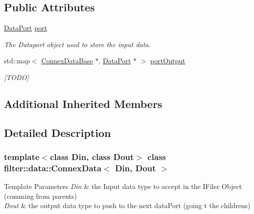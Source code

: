\subsection*{Public Attributes}
\begin{DoxyCompactItemize}
\item 
\hyperlink{classfilter_1_1data_1_1_data_port}{Data\+Port} \hyperlink{classfilter_1_1data_1_1_connex_data_a607857efe30c0053b56daf6a4da7c83f}{port}
\begin{DoxyCompactList}\small\item\em The Dataport object used to store the input data. \end{DoxyCompactList}\item 
\mbox{\label{classfilter_1_1data_1_1_connex_data_aeb46b767ed5e70caa0b1b15aecf1d353}} 
std\+::map$<$ \hyperlink{classfilter_1_1data_1_1_connex_data_base}{Connex\+Data\+Base} $\ast$, \hyperlink{classfilter_1_1data_1_1_data_port}{Data\+Port} $\ast$ $>$ \hyperlink{classfilter_1_1data_1_1_connex_data_aeb46b767ed5e70caa0b1b15aecf1d353}{port\+Output}
\begin{DoxyCompactList}\small\item\em \mbox{[}T\+O\+DO\mbox{]} \end{DoxyCompactList}\end{DoxyCompactItemize}
\subsection*{Additional Inherited Members}


\subsection{Detailed Description}
\subsubsection*{template$<$class Din, class Dout$>$\newline
class filter\+::data\+::\+Connex\+Data$<$ Din, Dout $>$}


\begin{DoxyTemplParams}{Template Parameters}
{\em Din} & the Input data type to accept in the I\+Filer Object (comming from parents) \\
\hline
{\em Dout} & the output data type to push to the next data\+Port (going t the childrens) \\
\hline
\end{DoxyTemplParams}


